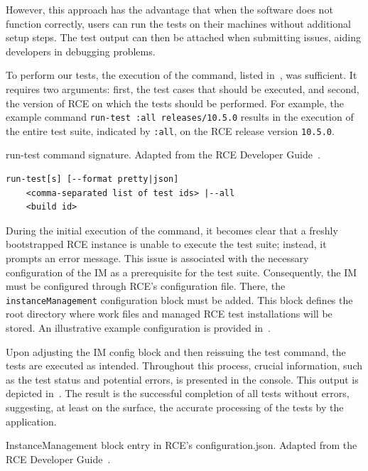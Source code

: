 However, this approach has the advantage that when the software does not function correctly, users can run the tests on their machines without additional setup steps. The test output can then be attached when submitting issues, aiding developers in debugging problems.

To perform our tests, the execution of the command, listed in~, was sufficient. It requires two arguments: first, the test cases that should be executed, and second, the version of \ac{RCE} on which the tests should be performed. For example, the example command \texttt{run-test :all releases/10.5.0} results in the execution of the entire test suite, indicated by \texttt{:all}, on the \ac{RCE} release version \texttt{10.5.0}.

\begin{listing}[ht]
\caption{run-test command signature. Adapted from the RCE Developer Guide~\cite{rceDevGuide10x}.}
\label{lst:run-tests-command}
\begin{verbatim}
run-test[s] [--format pretty|json] 
    <comma-separated list of test ids> |--all
    <build id>
\end{verbatim}
\end{listing}

During the initial execution of the command, it becomes clear that a freshly bootstrapped \ac{RCE} instance is unable to execute the test suite; instead, it prompts an error message. This issue is associated with the necessary configuration of the \ac{IM} as a prerequisite for the test suite. Consequently, the \ac{IM} must be configured through \ac{RCE}'s configuration file. There, the \texttt{instanceManagement} configuration block must be added. This block defines the root directory where work files and managed RCE test installations will be stored. An illustrative example configuration is provided in~.

Upon adjusting the \ac{IM} config block and then reissuing the test command, the tests are executed as intended. Throughout this process, crucial information, such as the test status and potential errors, is presented in the console. This output is depicted in~. The result is the successful completion of all tests without errors, suggesting, at least on the surface, the accurate processing of the tests by the application.

\begin{listing}[!ht]
    \caption{InstanceManagement block entry in \ac{RCE}'s configuration.json. Adapted from the RCE Developer Guide~\cite{rceDevGuide10x}.}
    \label{lst:configuration-json}
    \inputminted[linenos, xleftmargin=2em]{json}{files/code/configuration.json}
\end{listing}

